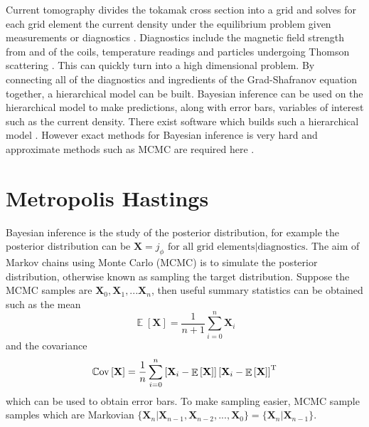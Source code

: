 \documentclass[10pt]{proc}
\DeclareMathOperator{\expectation}{\mathbb{E}}
\DeclareMathOperator{\cov}{\mathbb{C}ov}
\newcommand{\T}{^\textup{T}}
\newcommand{\dotdotdot}{...}
\begin{document}
Current tomography divides the tokamak cross section into a grid and solves for each grid element the current density under the equilibrium problem given measurements or diagnostics \citep{svensson2008current}. Diagnostics include the magnetic field strength from and of the coils, temperature readings and particles undergoing Thomson scattering \citep{svensson2004integrating} \citep{ford2009bayesian}. This can quickly turn into a high dimensional problem. By connecting all of the diagnostics and ingredients of the Grad-Shafranov equation together, a hierarchical model can be built. Bayesian inference can be used on the hierarchical model to make predictions, along with error bars, variables of interest such as the current density. There exist software which builds such a hierarchical model \citep{svensson2007large} \citep{svensson2008current} \citep{svensson2010connecting}. However exact methods for Bayesian inference is  very hard and approximate methods such as MCMC are required here \citep{ford2010tokamak}.

\section{Metropolis Hastings}
Bayesian inference is the study of the posterior distribution, for example the posterior distribution can be $\mathbf{X} = j_\phi\text{ for all grid elements}|\text{diagnostics}$. The aim of Markov chains using Monte Carlo (MCMC) is to simulate the posterior distribution, otherwise known as sampling the target distribution. Suppose the MCMC samples are $\mathbf{X}_0,\mathbf{X}_1,\dotdotdot\mathbf{X}_n$, then useful summary statistics can be obtained such as the mean
\begin{equation}
\expectation\left[\mathbf{X}\right] = \dfrac{1}{n+1}\sum_{i=0}^n \mathbf{X}_i
\end{equation}
and the covariance
\begin{equation}
\cov\left[\mathbf{X}\right] = \dfrac{1}{n}\sum_{i=0}^n \left[\mathbf{X}_i-\expectation\left[\mathbf{X}\right]\right]
\left[\mathbf{X}_i-\expectation\left[\mathbf{X}\right]\right]\T
\end{equation}
which can be used to obtain error bars. To make sampling easier, MCMC sample samples which are Markovian $\{\mathbf{X}_n|\mathbf{X}_{n-1},\mathbf{X}_{n-2},\dotdotdot,\mathbf{X}_{0}\} = \{\mathbf{X}_n|\mathbf{X}_{n-1}\}$.
\end{document}
